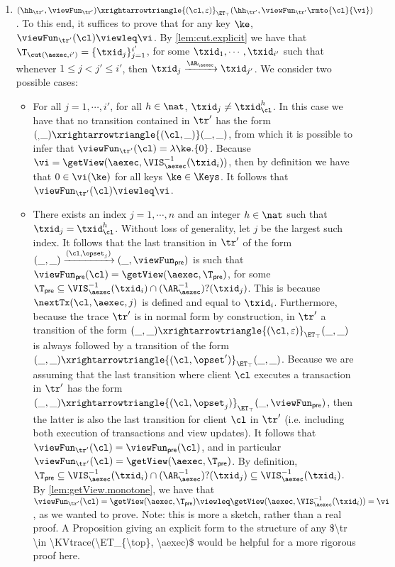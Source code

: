 \begin{itemize}
\begin{enumerate}
\item $(\hh_{\tr'}, \viewFun_{\tr'}) \xrightarrowtriangle{(\cl, \varepsilon)}_{\ET_{\top}} (\hh_{\tr'}, \viewFun_{\tr'}\rmto{\cl}{\vi})$. 
To this end, it suffices to prove that for any key $\ke$, $\viewFun_{\tr'}(\cl) \viewleq \vi$. 
By \cref{lem:cut.explicit} we have that $\T_{\cut(\aexec, i')} = \{\txid_{j}\}_{j=1}^{i'}$, for 
some $\txid_{1},\cdots, \txid_{i'}$ such that whenever $1 \leq j < j' \leq i'$, then 
$\txid_{j} \xrightarrow{\AR_{\aexec}} \txid_{j'}$. We consider two possible cases: 

\begin{itemize}
\item For all $j =1,\cdots, i'$, for all $h \in \nat$, $\txid_{j} \neq \txid_{\cl}^{h}$. In 
this case we have that no transition contained in $\tr'$ has the form 
$(_, \_) \xrightarrowtriangle{(\cl, \_)} (\_, \_)$, from which it is possible to infer 
that  $\viewFun_{\tr'}(\cl) = \lambda \ke. \{0\}$. Because $\vi = \getView(\aexec, \VIS^{-1}_{\aexec}(\txid_{i}))$, 
then by definition we have that $0 \in \vi(\ke)$ for all keys $\ke \in \Keys$. It follows that 
$\viewFun_{\tr'}(\cl) \viewleq \vi$. 
\item There exists an index $j = 1,\cdots, n$ and an integer $h \in \nat$ such that $\txid_{j} = \txid_{\cl}^{h}$. 
Without loss of generality, let $j$ be the largest such index. It follows that the last transition in $\tr'$ of the form 
$(\_, \_) \xrightarrow{(\cl, \opset_{j})} (\_, \viewFun_{\mathsf{pre}})$ is such that $\viewFun_{\mathsf{pre}}(\cl) = 
\getView(\aexec, \T_{\mathsf{pre}})$, for some $\T_{\mathsf{pre}} \subseteq \VIS^{-1}_{\aexec}(\txid_{i}) \cap 
(\AR^{-1}_{\aexec})?(\txid_{j})$. This is because $\nextTx(\cl, \aexec, j)$  is defined and equal to $\txid_{i}$. 
Furthermore, because the trace $\tr'$ is in normal form by construction, in $\tr'$ a transition of the form 
$(\_, \_) \xrightarrowtriangle{(\cl, \varepsilon)}_{\ET_{\top}} (\_, \_)$ is always followed by a transition of the form
$(\_, \_) \xrightarrowtriangle{(\cl, \opset')}_{\ET_{\top}} (\_, \_)$. Because we are assuming that the last transition where client 
$\cl$ executes a transaction in $\tr'$ has the form $(\_, \_) \xrightarrowtriangle{(\cl, \opset_{j})}_{\ET_{\top}} (\_, \viewFun_{\mathsf{pre}})$, 
then the latter is also the last transition for client $\cl$ in $\tr'$ (i.e. including both execution of transactions and view updates). 
It follows that $\viewFun_{\tr'}(\cl) = \viewFun_{\mathsf{pre}}(\cl)$, and in particular 
$\viewFun_{\tr'}(\cl) = \getView(\aexec, \T_{\mathsf{pre}})$. By definition, 
$\T_{\mathsf{pre}} \subseteq  \VIS^{-1}_{\aexec}(\txid_{i}) \cap (\AR^{-1}_{\aexec})?(\txid_{j}) 
\subseteq \VIS^{-1}_{\aexec}(\txid_{i})$. By  \cref{lem:getView.monotone}, 
we have that $\viewFun_{\tr'}(\cl) = \getView(\aexec, \T_{\mathsf{pre}}) \viewleq 
\getView(\aexec, \VIS^{-1}_{\aexec}(\txid_{i})) = \vi$, as we wanted to prove.
\ac{Note: this is more a sketch, rather than a real proof. A Proposition giving an explicit form to the 
structure of any $\tr \in \KVtrace(\ET_{\top}, \aexec)$ would be helpful for a more rigorous proof here.}
\end{itemize}



\end{enumerate}
\end{itemize}
